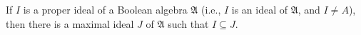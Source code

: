 If $I$ is a proper ideal of a Boolean algebra $\mathfrak{A}$ (i.e., $I$ is an ideal of $\mathfrak{A}$, and $I \neq A$), then there is a maximal ideal $J$ of $\mathfrak{A}$ such that $I \subseteq J$.
